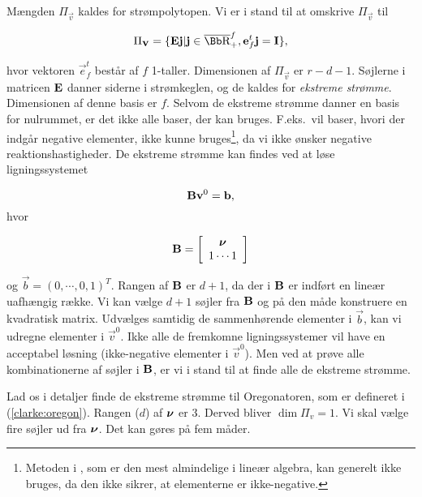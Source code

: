 M{\ae}ngden $\Pi_{\vec{v}}$ kaldes for str{\o}mpolytopen.
Vi er i stand til at omskrive $\Pi_{\vec{v}}$ til

\begin{equation}
  \Pi_{\vec{v}} = \{ \matrix{E}\vec{j} | \vec{j}\in\overline{\R}^f_+,
  \vec{e}_f^t\vec{j} = \matrix{I} \},
\end{equation}

hvor vektoren $\vec{e}_f^t$ best{\aa}r af $f$ 1-taller.
Dimensionen af $\Pi_{\vec{v}}$ er $r-d-1$. S{\o}jlerne i
matricen $\mbox{${\bf E}$}$ danner siderne i str{\o}mkeglen, og
de kaldes for {\em ekstreme str{\o}mme}. Dimensionen af
denne basis er $f$. Selvom de ekstreme str{\o}mme danner en
basis for nulrummet, er det ikke alle baser, der kan
bruges. F.eks.\ vil baser, hvori der indg{\aa}r negative
elementer, ikke kunne bruges\footnote{Metoden i
\cite{Mat1LA}, som er den mest almindelige i line{\ae}r
algebra, kan generelt ikke bruges, da den ikke sikrer, at
elementerne er ikke-negative.}, da vi ikke {\o}nsker
negative reaktionshastigheder. De ekstreme str{\o}mme kan
findes ved at l{\o}se ligningssystemet

\begin{equation}
\mbox{${\bf B}$}\mbox{${\bf v}$}^0 = \mbox{${\bf b}$},
\end{equation}
hvor 

\[
\mbox{${\bf B}$} = \left[
\begin{array}{c}
\mbox{\boldmath $\nu$} \\
1 \cdots 1 
\end{array} \right]
\]

og $\vec{b} = (0, \cdots, 0, 1)^T$. Rangen af $\mbox{${\bf B}$}$
er $d+1$, da der i $\mbox{${\bf B}$}$ er indf{\o}rt en line{\ae}r
uafh{\ae}ngig r{\ae}kke. Vi kan v{\ae}lge $d+1$ s{\o}jler
fra $\mbox{${\bf B}$}$ og p{\aa} den m{\aa}de konstruere en
kvadratisk matrix. Udv{\ae}lges samtidig de
sammenh{\o}rende elementer i $\vec{b}$, kan vi udregne
elementer i $\vec{v}^0$. Ikke alle de fremkomne
ligningssystemer vil have en acceptabel l{\o}sning
(ikke-negative elementer i $\vec{v}^0$). Men ved at
pr{\o}ve alle kombinationerne af s{\o}jler i $\mbox{${\bf B}$}$,
er vi i stand til at finde alle de ekstreme str{\o}mme.

\vspace{4.0mm}
Lad os i detaljer finde de ekstreme str{\o}mme til
Oregonatoren, som er defineret i (\ref{clarke:oregon}).
Rangen ($d$) af $\mbox{\boldmath $\nu$}$ er 3. Derved bliver $\dim
\Pi_v = 1$. Vi skal v{\ae}lge fire s{\o}jler ud fra
$\mbox{\boldmath $\nu$}$. Det kan g{\o}res p{\aa} fem m{\aa}der.

